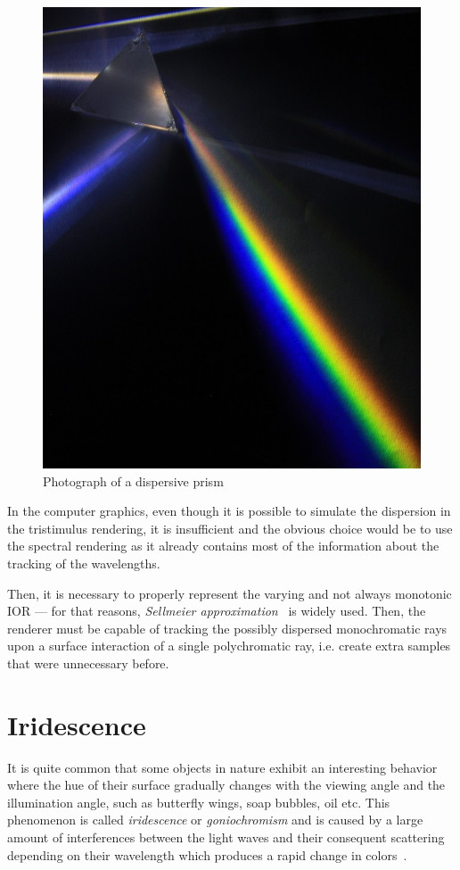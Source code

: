 \begin{figure}[h]
	\centering
	\includegraphics[width=.6\linewidth]{img/dispersion.jpg}
	\caption[nikon]{Photograph of a dispersive prism\footnotemark}
	\label{fig:dispersion}
\end{figure}

In the computer graphics, even though it is possible to simulate the dispersion in the tristimulus rendering, it is insufficient and the obvious choice would be to use the spectral rendering as it already contains most of the information about the tracking of the wavelengths. 

Then, it is necessary to properly represent the varying and not always monotonic IOR --- for that reasons, \emph{Sellmeier approximation}~\cite{wilkie2002tone} is widely used. Then, the renderer must be capable of tracking the possibly dispersed monochromatic rays upon a surface interaction of a single polychromatic ray, i.e. create extra samples that were unnecessary before.

\section{Iridescence}
\label{sec:irid}

It is quite common that some objects in nature exhibit an interesting behavior where the hue of their surface gradually changes with the viewing angle and the illumination angle, such as butterfly wings, soap bubbles, oil etc. This phenomenon is called \emph{iridescence} or \emph{goniochromism} and is caused by a large amount of interferences between the light waves and their consequent scattering depending on their wavelength which produces a rapid change in colors~\cite{belcour2017practical}.

